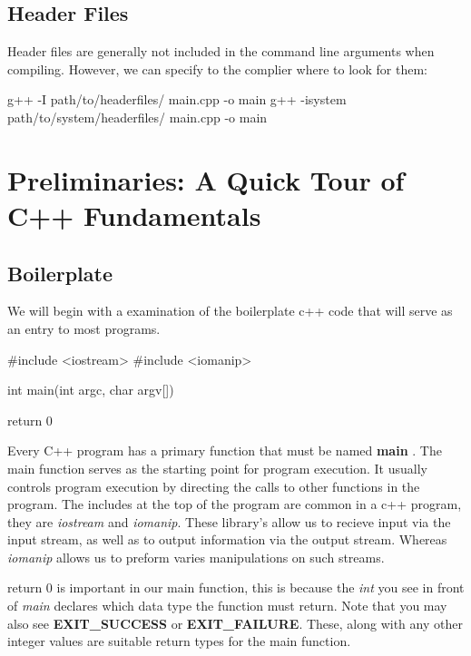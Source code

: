 \documentclass{report}
\begin{document}
    \bigbreak \noindent 
    \subsection{Header Files}
    Header files are generally not included in the command line arguments when compiling. However, we can specify to the complier where to look for them:
    \bigbreak \noindent 
    
    \begin{cppcode}
g++ -I path/to/headerfiles/ main.cpp -o main
g++ -isystem path/to/system/headerfiles/ main.cpp -o main
    \end{cppcode}
    
















    \pagebreak \bigbreak \noindent 
    \section{\LARGE Preliminaries: A Quick Tour of C++ Fundamentals}
    \bigbreak \noindent 
    \subsection{Boilerplate}
    \bigbreak \noindent 
    We will begin with a examination of the boilerplate c++ code that will serve as an entry to most programs.
    
    \begin{cppcode}
#include <iostream>
#include <iomanip>

int main(int argc, char argv[]){

    return 0
}
    \end{cppcode}
    
    \bigbreak \noindent 
    Every C++ program has a primary function that must be named \textbf{main} . The main function serves as the starting point for program execution. It usually controls program execution by directing the calls to other functions in the program.
    \bigbreak \noindent 
    The includes at the top of the program are common in a c++ program, they are \textit{iostream} and \textit{iomanip}. These library's allow us to recieve input via the input stream, as well as to output information  via the output stream. Whereas \textit{iomanip} allows us to preform varies manipulations on such streams.
    \bigbreak \noindent 
    \begin{notebox}
        return 0 is important in our main function, this is because the \textit{int} you see in front of \textit{main} declares which data type the function must return. Note that you may also see \textbf{EXIT\_SUCCESS} or \textbf{EXIT\_FAILURE}. These, along with any other integer values are suitable return types for the main function.
    \end{notebox}
\end{document}
